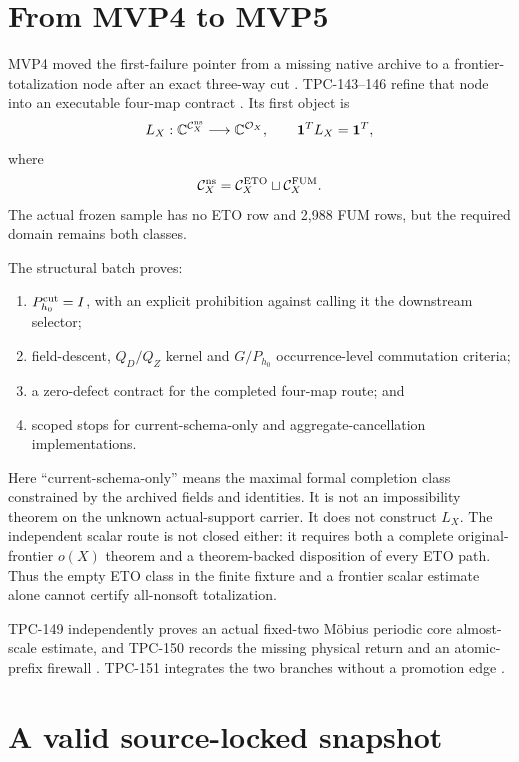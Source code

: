 \documentclass[11pt]{article}
\theoremstyle{definition}
\theoremstyle{remark}
\begin{document}
\section{From MVP4 to MVP5}

MVP4 moved the first-failure pointer from a missing native archive to
a frontier-totalization node after an exact three-way cut
\citep{WangTPC141,WangTPC142}.  TPC-143--146 refine that node into an
executable four-map contract \citep{WangTPC143,WangTPC146}.  Its first
object is
\[
 L_X:\mathbb C^{\mathcal C_X^{\rm ns}}
 \longrightarrow \mathbb C^{\mathcal O_X},
 \qquad {\bf1}^{T}L_X={\bf1}^{T},
\]
where
\[
 \mathcal C_X^{\rm ns}
 =
 \mathcal C_X^{\rm ETO}\sqcup\mathcal C_X^{\rm FUM}.
\]
The actual frozen sample has no ETO row and 2,988 FUM rows, but the
required domain remains both classes.

The structural batch proves:
\begin{enumerate}[label=(\roman*),leftmargin=2.2em]
\item \(P_{h_0}^{\rm cut}=I\), with an explicit prohibition against
  calling it the downstream selector;
\item field-descent, \(Q_D/Q_Z\) kernel and \(G/P_{h_0}\)
  occurrence-level commutation criteria;
\item a zero-defect contract for the completed four-map route; and
\item scoped stops for current-schema-only and
  aggregate-cancellation implementations.
\end{enumerate}
Here ``current-schema-only'' means the maximal formal completion class
constrained by the archived fields and identities.  It is not an
impossibility theorem on the unknown actual-support carrier.
It does not construct \(L_X\).  The independent scalar route is not
closed either: it requires both a complete original-frontier
\(o(X)\) theorem and a theorem-backed disposition of every ETO path.
Thus the empty ETO class in the finite fixture and a frontier scalar
estimate alone cannot certify all-nonsoft totalization.

TPC-149 independently proves an actual fixed-two M\"obius periodic
core almost-scale estimate, and TPC-150 records the missing physical
return and an atomic-prefix firewall \citep{WangTPC149,WangTPC150}.
TPC-151 integrates the two branches without a promotion edge
\citep{WangTPC151}.

\section{A valid source-locked snapshot}
\end{document}
